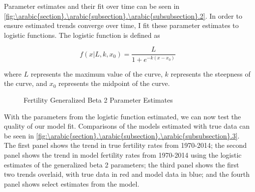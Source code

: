 \documentclass[10pt]{article}
\renewcommand{\thesection}{\arabic{section}}
\renewcommand{\thesubsection}{\thesection.\arabic{subsection}}
\renewcommand{\thesubsubsection}{\thesubsection.\arabic{subsubsection}}
\numberwithin{equation}{subsection}
\newcommand*{\FigureDir}{../../graphs}
\begin{document}
\par Parameter estimates and their fit over time can be seen in \autoref{fig:\thesubsubsection.2}. In order to ensure estimated trends converge over time, I fit these parameter estimates to logistic functions. The logistic function is defined as

\begin{equation}\label{eq:logistic_fn}
   f(x|L, k, x_0) = \frac{L}{1 + e^{-k(x-x_0)}}
\end{equation}

\par where \(L\) represents the maximum value of the curve, \(k\) represents the steepness of the curve, and \(x_0\) represents the midpoint of the curve.

\begin{figure}[!ht]
   \centering
   \caption{\label{fig:\thesubsubsection.2}Fertility Generalized Beta 2 Parameter Estimates}
\end{figure}

\par With the parameters from the logistic function estimated, we can now test the quality of our model fit. Comparisons of the models estimated with true data can be seen in \autoref{fig:\thesubsubsection.3}. The first panel shows the trend in true fertility rates from 1970-2014; the second panel shows the trend in model fertility rates from 1970-2014 using the logistic estimates of the generalized beta 2 parameters; the third panel shows the first two trends overlaid, with true data in red and model data in blue; and the fourth panel shows select estimates from the model.
\end{document}
